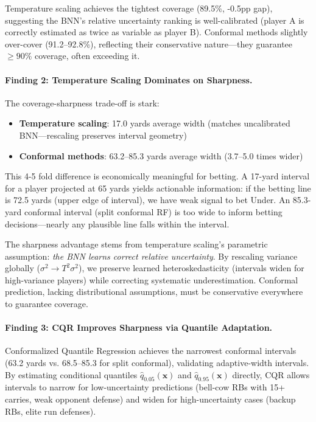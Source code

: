 Temperature scaling achieves the tightest coverage (89.5\%, -0.5pp gap), suggesting the BNN's relative uncertainty ranking is well-calibrated (player A is correctly estimated as twice as variable as player B). Conformal methods slightly over-cover (91.2--92.8\%), reflecting their conservative nature—they guarantee $\geq 90\%$ coverage, often exceeding it.

\paragraph{Finding 2: Temperature Scaling Dominates on Sharpness.}
The coverage-sharpness trade-off is stark:

\begin{itemize}
    \item \textbf{Temperature scaling}: 17.0 yards average width (matches uncalibrated BNN—rescaling preserves interval geometry)
    \item \textbf{Conformal methods}: 63.2--85.3 yards average width (3.7--5.0 times wider)
\end{itemize}

This 4-5 fold difference is economically meaningful for betting. A 17-yard interval for a player projected at 65 yards yields actionable information: if the betting line is 72.5 yards (upper edge of interval), we have weak signal to bet Under. An 85.3-yard conformal interval (split conformal RF) is too wide to inform betting decisions—nearly any plausible line falls within the interval.

The sharpness advantage stems from temperature scaling's parametric assumption: \textit{the BNN learns correct relative uncertainty}. By rescaling variance globally ($\sigma^2 \to T^2 \sigma^2$), we preserve learned heteroskedasticity (intervals widen for high-variance players) while correcting systematic underestimation. Conformal prediction, lacking distributional assumptions, must be conservative everywhere to guarantee coverage.

\paragraph{Finding 3: CQR Improves Sharpness via Quantile Adaptation.}
Conformalized Quantile Regression achieves the narrowest conformal intervals (63.2 yards vs. 68.5--85.3 for split conformal), validating adaptive-width intervals. By estimating conditional quantiles $\hat{q}_{0.05}(\mathbf{x})$ and $\hat{q}_{0.95}(\mathbf{x})$ directly, CQR allows intervals to narrow for low-uncertainty predictions (bell-cow RBs with 15+ carries, weak opponent defense) and widen for high-uncertainty cases (backup RBs, elite run defenses).

